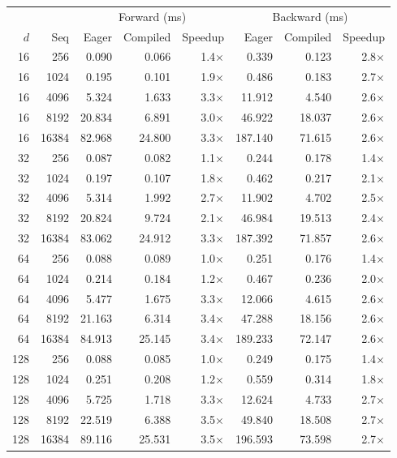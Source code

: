 \documentclass[11pt]{article}
\begin{document}
\begin{center}
\scriptsize
\begin{tabular}{r r | r r r | r r r}
\toprule
 & & \multicolumn{3}{c|}{Forward (ms)} & \multicolumn{3}{c}{Backward (ms)} \\
$d$ & Seq & Eager & Compiled & Speedup & Eager & Compiled & Speedup \\
\midrule
16 & 256   &  0.090 &  0.066 & 1.4$\times$ &  0.339 &  0.123 & 2.8$\times$ \\
16 & 1024  &  0.195 &  0.101 & 1.9$\times$ &  0.486 &  0.183 & 2.7$\times$ \\
16 & 4096  &  5.324 &  1.633 & 3.3$\times$ & 11.912 &  4.540 & 2.6$\times$ \\
16 & 8192  & 20.834 &  6.891 & 3.0$\times$ & 46.922 & 18.037 & 2.6$\times$ \\
16 & 16384 & 82.968 & 24.800 & 3.3$\times$ &187.140 & 71.615 & 2.6$\times$ \\
\midrule
32 & 256   &  0.087 &  0.082 & 1.1$\times$ &  0.244 &  0.178 & 1.4$\times$ \\
32 & 1024  &  0.197 &  0.107 & 1.8$\times$ &  0.462 &  0.217 & 2.1$\times$ \\
32 & 4096  &  5.314 &  1.992 & 2.7$\times$ & 11.902 &  4.702 & 2.5$\times$ \\
32 & 8192  & 20.824 &  9.724 & 2.1$\times$ & 46.984 & 19.513 & 2.4$\times$ \\
32 & 16384 & 83.062 & 24.912 & 3.3$\times$ &187.392 & 71.857 & 2.6$\times$ \\
\midrule
64 & 256   &  0.088 &  0.089 & 1.0$\times$ &  0.251 &  0.176 & 1.4$\times$ \\
64 & 1024  &  0.214 &  0.184 & 1.2$\times$ &  0.467 &  0.236 & 2.0$\times$ \\
64 & 4096  &  5.477 &  1.675 & 3.3$\times$ & 12.066 &  4.615 & 2.6$\times$ \\
64 & 8192  & 21.163 &  6.314 & 3.4$\times$ & 47.288 & 18.156 & 2.6$\times$ \\
64 & 16384 & 84.913 & 25.145 & 3.4$\times$ &189.233 & 72.147 & 2.6$\times$ \\
\midrule
128 & 256   &  0.088 &  0.085 & 1.0$\times$ &  0.249 &  0.175 & 1.4$\times$ \\
128 & 1024  &  0.251 &  0.208 & 1.2$\times$ &  0.559 &  0.314 & 1.8$\times$ \\
128 & 4096  &  5.725 &  1.718 & 3.3$\times$ & 12.624 &  4.733 & 2.7$\times$ \\
128 & 8192  & 22.519 &  6.388 & 3.5$\times$ & 49.840 & 18.508 & 2.7$\times$ \\
128 & 16384 & 89.116 & 25.531 & 3.5$\times$ &196.593 & 73.598 & 2.7$\times$ \\
\bottomrule
\end{tabular}
\end{center}
\end{document}
